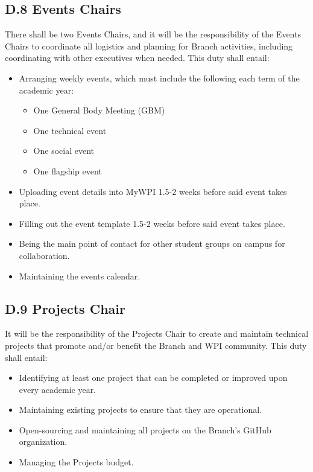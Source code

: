 \documentclass[11pt,a4paper]{article}
\begin{document}
\subsection*{D.8 Events Chairs}
There shall be two Events Chairs, and it will be the responsibility of the Events Chairs to coordinate all logistics and planning for Branch activities, including coordinating with other executives when needed. This duty shall entail:
\begin{itemize}[noitemsep]
    \item Arranging weekly events, which must include the following each term of the academic year:
    \begin{itemize}[noitemsep]
        \item One General Body Meeting (GBM)
        \item One technical event
        \item One social event
        \item One flagship event
    \end{itemize}
    \item Uploading event details into MyWPI 1.5-2 weeks before said event takes place.
    \item Filling out the event template 1.5-2 weeks before said event takes place.
    \item Being the main point of contact for other student groups on campus for collaboration.
    \item Maintaining the events calendar.
\end{itemize}

\subsection*{D.9 Projects Chair}
It will be the responsibility of the Projects Chair to create and maintain technical projects that promote and/or benefit the Branch and WPI community. This duty shall entail:
\begin{itemize}[noitemsep]
    \item Identifying at least one project that can be completed or improved upon every academic year.
    \item Maintaining existing projects to ensure that they are operational.
    \item Open-sourcing and maintaining all projects on the Branch's GitHub organization.
    \item Managing the Projects budget.
\end{itemize}
\end{document}
